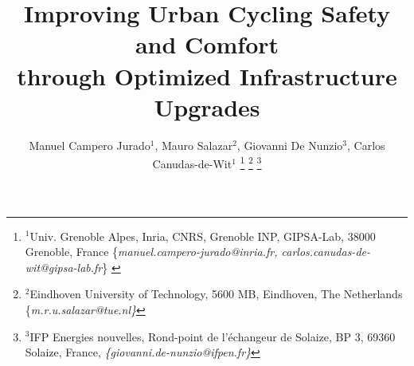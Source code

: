 \documentclass[letterpaper, 10 pt, conference]{ieeeconf}  %
\title{\LARGE \bf Improving Urban Cycling Safety and Comfort\\ through Optimized Infrastructure Upgrades   }
\author{Manuel Campero Jurado$^{1}$, Mauro Salazar$^{2}$, Giovanni De Nunzio$^{3}$, Carlos Canudas-de-Wit$^{1}$%
\thanks{$^{1}$Univ. Grenoble Alpes, Inria, CNRS, Grenoble INP, GIPSA-Lab, 38000 Grenoble, France
        {\footnotesize \{\textit{manuel.campero-jurado@inria.fr, carlos.canudas-de-wit@gipsa-lab.fr}\} }}%
\thanks{$^{2}$Eindhoven University of Technology, 5600 MB, Eindhoven, The Netherlands
        {\footnotesize \{\textit{m.r.u.salazar@tue.nl\}}}}%
\thanks{$^{3}$IFP Energies nouvelles,
Rond-point de l’échangeur de Solaize, BP 3, 69360 Solaize, France,
        {\footnotesize \textit{\{giovanni.de-nunzio@ifpen.fr\}}}}%
}
\begin{document}
\pagestyle{empty}


\maketitle


\begin{abstract}




\end{abstract}
\end{document}
